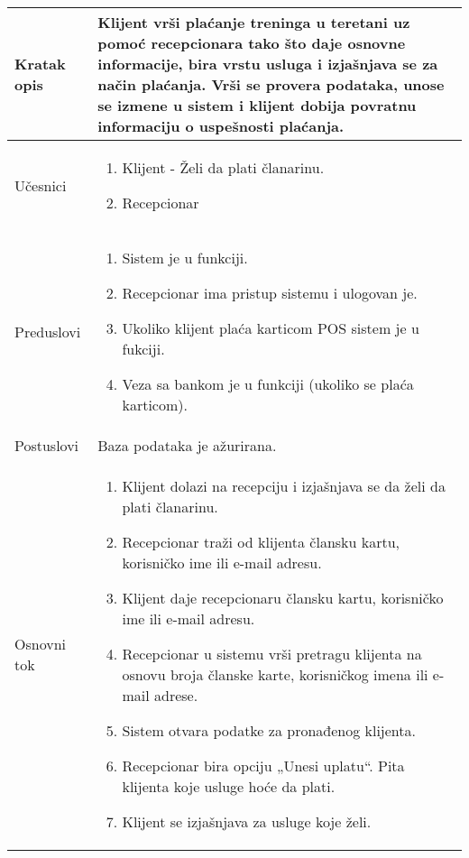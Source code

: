 \documentclass[../main.tex]{subfiles}
\begin{document}
\begin{longtable}{| p{} | p{} |} 

\hline
    Kratak opis &  Klijent vrši plaćanje treninga u teretani uz pomoć recepcionara tako što daje osnovne informacije, bira vrstu usluga i izjašnjava se za način plaćanja. Vrši se provera podataka, unose se izmene u sistem i klijent dobija povratnu informaciju o uspešnosti plaćanja.\\ 
\hline    
    Učesnici & 
    	\begin{enumerate}
        \item Klijent - Želi da plati članarinu. 
        \item Recepcionar
     \end{enumerate}\\
\hline
   Preduslovi & \begin{enumerate}
       \item Sistem je u funkciji.
       \item Recepcionar ima pristup sistemu i ulogovan je.
       \item Ukoliko klijent plaća karticom POS sistem je u fukciji.
       \item Veza sa bankom je u funkciji (ukoliko se plaća karticom).	
   \end{enumerate}\\
\hline  
    Postuslovi & 
         Baza podataka je ažurirana.
    \\
\hline
    Osnovni tok & \begin{enumerate}
        \item Klijent dolazi na recepciju i izjašnjava se da želi da plati članarinu.
        \item Recepcionar traži od klijenta člansku kartu, korisničko ime ili e-mail adresu.	
        \item Klijent daje recepcionaru člansku kartu, korisničko ime ili e-mail adresu.
        \item Recepcionar u sistemu vrši pretragu klijenta na osnovu broja članske karte, korisničkog imena ili e-mail adrese.
        \item Sistem otvara podatke za pronađenog klijenta.
        \item Recepcionar bira opciju „Unesi uplatu“. Pita klijenta koje usluge hoće da plati.
        \item Klijent se izjašnjava za usluge koje želi.

\end{enumerate}
\end{longtable}
\end{document}
